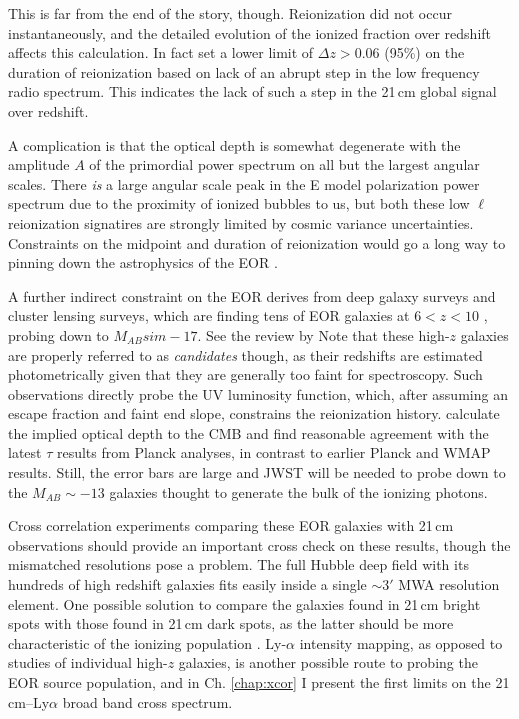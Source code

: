 This is far from the end of the story, though. Reionization did not occur instantaneously, and the detailed evolution of the ionized fraction over redshift affects this calculation. In fact \citet{bowman2010} set a lower limit of $\Delta z>0.06$ (95\%) on the duration of reionization based on lack of an abrupt step in the low frequency radio spectrum. This indicates the lack of such a step in the 21\,cm global signal over redshift. 

A complication is that the optical depth is somewhat degenerate with the amplitude $A$ of the primordial power spectrum on all but the largest angular scales. There \textit{is} a large angular scale peak in the E model polarization power spectrum due to the proximity of ionized bubbles to us, but both these low $\ell$ reionization signatires are strongly limited by cosmic variance uncertainties. Constraints on the midpoint and duration of reionization would go a long way to pinning down the astrophysics of the EOR \citep{liu15a}.

A further indirect constraint on the EOR derives from deep galaxy surveys and cluster lensing surveys, which are finding tens of EOR galaxies at $6<z<10$ \citep{Bouwens2011,Illingworth2013,Dunlop2013}, probing down to $M_{AB}sim-17$. See the review by \citet{madau14review} Note that these high-$z$ galaxies are properly referred to as \textit{candidates} though, as their redshifts are estimated photometrically given that they are generally too faint for spectroscopy. Such observations directly probe the UV luminosity function, which, after assuming an escape fraction and faint end slope, constrains the reionization history. \citet{RobertsonReionization2015} calculate the implied optical depth to the CMB and find reasonable agreement with the latest $\tau$ results from Planck analyses, in contrast to earlier Planck \citep{Robertson2013} and WMAP \citep{hinshaw_et_al_2012} results. Still, the error bars are large and JWST will be needed to probe down to the $M_{AB}\sim-13$ galaxies thought to generate the bulk of the ionizing photons.

Cross correlation experiments comparing these EOR galaxies with 21\,cm observations should provide an important cross check on these results, though the mismatched resolutions pose a problem. The full Hubble deep field with its hundreds of high redshift galaxies fits easily inside a single $\sim3'$ MWA resolution element. One possible solution to compare the galaxies found in 21\,cm bright spots with those found in 21\,cm dark spots, as the latter should be more characteristic of the ionizing population \citep{beardsley15}. Ly-$\alpha$ intensity mapping, as opposed to studies of individual high-$z$ galaxies, is another possible route to probing the EOR source population, and in Ch. \ref{chap:xcor} I present the first limits on the 21\,cm--Ly$\alpha$ broad band cross spectrum.

